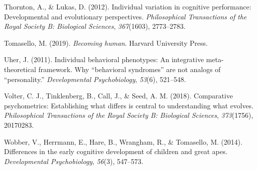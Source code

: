 \documentclass[
  man,floatsintext]{apa6}
\newlength{\cslhangindent}
\newlength{\cslentryspacingunit} %
\newenvironment{CSLReferences}[2] %
 {%
  \setlength{\parindent}{0pt}
  \ifodd #1
  \let\oldpar\par
  \def\par{\hangindent=\cslhangindent\oldpar}
  \fi
  \setlength{\parskip}{#2\cslentryspacingunit}
 }%
 {}
\begin{document}
\begin{CSLReferences}{1}{0}
\leavevmode{}%
Thornton, A., \& Lukas, D. (2012). Individual variation in cognitive performance: Developmental and evolutionary perspectives. \emph{Philosophical Transactions of the Royal Society B: Biological Sciences}, \emph{367}(1603), 2773--2783.

\leavevmode{}%
Tomasello, M. (2019). \emph{Becoming human}. Harvard University Press.

\leavevmode{}%
Uher, J. (2011). Individual behavioral phenotypes: An integrative meta-theoretical framework. Why {``behavioral syndromes''} are not analogs of {``personality.''} \emph{Developmental Psychobiology}, \emph{53}(6), 521--548.

\leavevmode{}%
Volter, C. J., Tinklenberg, B., Call, J., \& Seed, A. M. (2018). Comparative psychometrics: Establishing what differs is central to understanding what evolves. \emph{Philosophical Transactions of the Royal Society B: Biological Sciences}, \emph{373}(1756), 20170283.

\leavevmode{}%
Wobber, V., Herrmann, E., Hare, B., Wrangham, R., \& Tomasello, M. (2014). Differences in the early cognitive development of children and great apes. \emph{Developmental Psychobiology}, \emph{56}(3), 547--573.

\end{CSLReferences}

\endgroup
\end{document}
